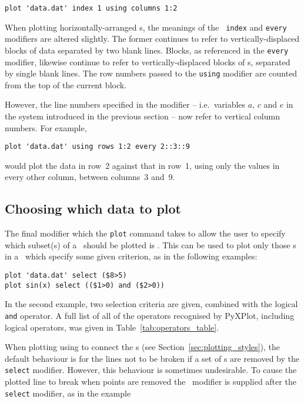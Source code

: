 \begin{verbatim}
plot 'data.dat' index 1 using columns 1:2
\end{verbatim}

When plotting horizontally-arranged \datafile s, the meanings of the {\tt
index} and {\tt every} modifiers are altered slightly. The former continues to
refer to vertically-displaced blocks of data separated by two blank lines.
Blocks, as referenced in the {\tt every} modifier, likewise continue to refer
to vertically-displaced blocks of \datapoint s, separated by single blank
lines. The row numbers passed to the {\tt using} modifier are counted from the
top of the current block.

However, the line numbers specified in the  modifier -- i.e.\
variables $a$, $c$ and $e$ in the system introduced in the previous section --
now refer to vertical column numbers. For example,

\begin{verbatim}
plot 'data.dat' using rows 1:2 every 2::3::9
\end{verbatim}

\noindent would plot the data in row~2 against that in row~1, using only the
values in every other column, between columns~3 and~9.

\subsection{Choosing which data to plot}
\label{sec:select_modifier}

The final modifier which the {\tt plot} command takes to allow the user to
specify which subset(s) of a \datafile\ should be plotted is .
This can be used to plot only those \datapoint s in a \datafile\ which specify
some given criterion, as in the following examples:

\begin{verbatim}
plot 'data.dat' select ($8>5)
plot sin(x) select (($1>0) and ($2>0))
\end{verbatim}

\noindent In the second example, two selection criteria are given, combined
with the logical {\tt and} operator. A full list of all of the operators
recognised by PyXPlot, including logical operators, was given in
Table~\ref{tab:operators_table}.

When plotting using  to connect the \datapoint s (see
Section~\ref{sec:plotting_styles}), the default behaviour is for the lines not
to be broken if a set of \datapoint s are removed by the {\tt select} modifier.
However, this behaviour is sometimes undesirable.  To cause the plotted line to
break when points are removed the \indmodt{discontinuous}\ modifier is supplied
after the {\tt select} modifier, as in the example

